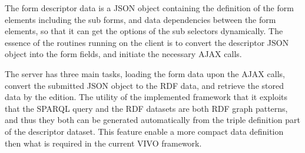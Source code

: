
The form descriptor data is a JSON object containing the definition of the form elements including the sub forms, and data dependencies between the form elements, so that it can get the options of the sub selectors dynamically. The essence of the routines running on the client is to convert the descriptor JSON object into the form fields, and initiate the necessary AJAX calls.

The server has three main tasks, loading the form data upon the AJAX calls, convert the submitted JSON object to the RDF data, and retrieve the stored data by the edition. The utility of the implemented framework that it exploits that the SPARQL query and the RDF datasets are both RDF graph patterns, and thus they both can be generated automatically from the triple definition part of the descriptor dataset. This feature enable a more compact data definition then what is required in the current VIVO framework.


